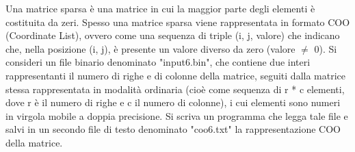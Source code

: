 \begin{Exercise}[label={ex:matrice}]
    Una matrice sparsa è una matrice in cui la maggior parte degli elementi è costituita da zeri. 
    Spesso una matrice sparsa viene rappresentata in formato COO (Coordinate List), 
    ovvero come una sequenza di triple (i, j, valore) che indicano che, nella posizione (i, j), 
    è presente un valore diverso da zero (valore $\neq$ 0). Si consideri un file binario denominato 
    "input6.bin", che contiene due interi rappresentanti il numero di righe e di colonne della matrice, 
    seguiti dalla matrice stessa rappresentata in modalità ordinaria (cioè come sequenza di r * c elementi,
    dove r è il numero di righe e c il numero di colonne), i cui elementi sono numeri
    in virgola mobile a doppia precisione.
    Si scriva un programma che legga tale file e salvi in un secondo file di testo denominato "coo6.txt" 
    la rappresentazione COO della matrice.
\end{Exercise}

\begin{Answer}[ref={ex:matrice}]
  	
\end{Answer}

